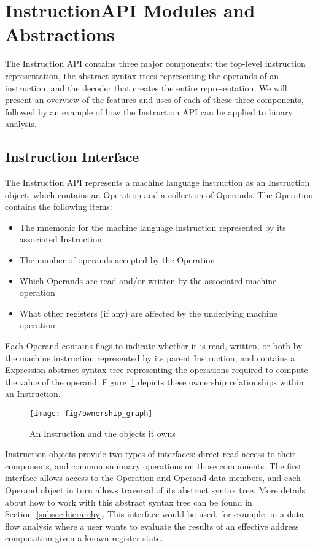 \section{InstructionAPI Modules and Abstractions}

The Instruction API contains three major components: the top-\/level instruction
representation, the abstract syntax trees representing the operands of an
instruction, and the decoder that creates the entire representation. We will
present an overview of the features and uses of each of these three components,
followed by an example of how the Instruction API can be applied to binary
analysis. 

\subsection{Instruction Interface}

The Instruction API represents a machine language instruction as an Instruction
object, which contains an Operation and a collection of Operands. The Operation
contains the following items:

\begin{itemize}
\item The mnemonic for the machine language instruction represented by its associated Instruction
\item The number of operands accepted by the Operation
\item Which Operands are read and/or written by the associated machine operation
\item What other registers (if any) are affected by the underlying machine operation
\end{itemize}

Each Operand contains flags to indicate whether it is read, written, or both by
the machine instruction represented by its parent Instruction, and contains a
Expression abstract syntax tree representing the operations required to compute
the value of the operand. Figure~\ref{fig:ownership-graph} depicts these
ownership relationships within an Instruction. 

\begin{figure}
\centering
    \texttt{[image: fig/ownership\_graph]}
\caption{An Instruction and the objects it owns}
\label{fig:ownership-graph}
\end{figure}

Instruction objects provide two types of interfaces: direct read access to their
components, and common summary operations on those components. The first
interface allows access to the Operation and Operand data members, and each
Operand object in turn allows traversal of its abstract syntax tree. More
details about how to work with this abstract syntax tree can be found in
Section~\ref{subsec:hierarchy}.
This interface would be used, for example, in a data flow analysis where a user wants
to evaluate the results of an effective address computation given a known
register state.

